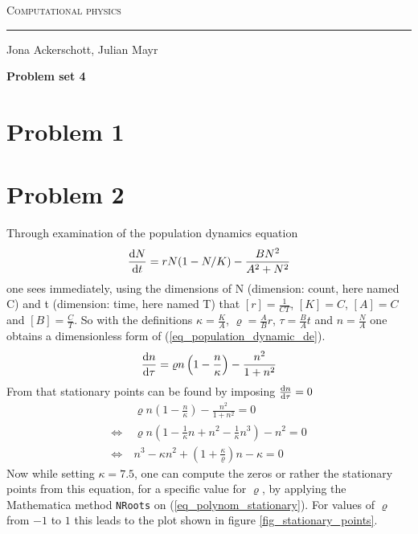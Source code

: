 \documentclass[12pt, a4paper]{article}
\begin{document}
  \centerline{\Huge\scshape Computational physics}
  \vspace*{0.5cm}
  \hrule
  \vspace*{0.5cm}
  \centerline{Jona Ackerschott, Julian Mayr}
  \vspace*{1cm}
  \centerline{\Large\bfseries Problem set 4}
  \vspace*{0.5cm}

  \section*{Problem 1}

  \section*{Problem 2}
  Through examination of the population dynamics equation
  \begin{align}
    \frac{{\rm d} N}{{\rm d} t} = r N (1 - N / K) - \frac{B N^2}{A^2+N^2}
    \label{eq_population_dynamic_de}
  \end{align}
  one sees immediately, using the dimensions of N (dimension: count, here named C) and t (dimension: time, here named T) that $[r] = \frac{1}{C T}$, $[K] = C$, $[A] = C$ and $[B] = \frac{C}{T}$. So with the definitions $\kappa = \frac{K}{A}$, $\varrho = \frac{A}{B} r$, $\tau = \frac{B}{A} t$ and $n = \frac{N}{A}$ one obtains a dimensionless form of (\ref{eq_population_dynamic_de}).
  \begin{align}
    \frac{{\rm d} n}{{\rm d} \tau} = \varrho n \left(1 - \frac{n}{\kappa} \right)
      - \frac{n^2}{1 + n^2}
    \label{eq_population_dynamic_de_dimless}
  \end{align}
  From that stationary points can be found by imposing $\frac{{\rm d} n}{{\rm d} \tau} = 0$
  \begin{align}
    & \varrho n \left(1 - \frac{n}{\kappa} \right)
      - \frac{n^2}{1 + n^2} = 0 \nonumber \\
    \Leftrightarrow \ & \varrho n \left(1 - \frac{1}{\kappa} n + n^2
      - \frac{1}{\kappa} n^3 \right) - n^2 = 0 \nonumber \\
    \Leftrightarrow \ & n^3 - \kappa n^2
      + \left(1 + \frac{\kappa}{\varrho}\right) n - \kappa = 0
    \label{eq_polynom_stationary}
  \end{align}
  Now while setting $\kappa = 7.5$, one can compute the zeros or rather the stationary points from this equation, for a specific value for $\varrho$, by applying the Mathematica method \texttt{NRoots} on (\ref{eq_polynom_stationary}). For values of $\varrho$ from $-1$ to $1$ this leads to the plot shown in figure \ref{fig_stationary_points}.
\end{document}
